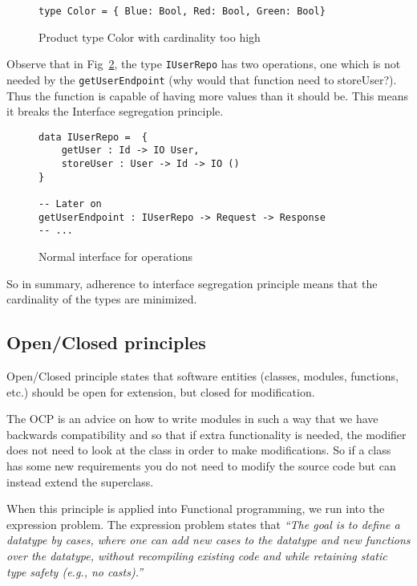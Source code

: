 \begin{figure}[H]
    \begin{lstlisting}
type Color = { Blue: Bool, Red: Bool, Green: Bool}
    \end{lstlisting}
    \caption{Product type Color with cardinality too high}
    \label{colorcardinality}
\end{figure}

Observe that in Fig~\ref{twomanyoperations}, the type \texttt{IUserRepo} has two
operations, one which is not needed by the \texttt{getUserEndpoint} (why would 
that function need to storeUser?). Thus the function is capable of having more 
values than it should be. This means it breaks the Interface segregation principle.

\begin{figure}[H]
    \begin{lstlisting}
data IUserRepo =  {
	getUser : Id -> IO User,
	storeUser : User -> Id -> IO ()
}

-- Later on
getUserEndpoint : IUserRepo -> Request -> Response
-- ...
    \end{lstlisting}
    \caption{Normal interface for operations}
    \label{twomanyoperations}
\end{figure}

So in summary, adherence to interface segregation principle means that the
cardinality of the types are minimized.

\subsection{Open/Closed principles}\label{openclosed}

Open/Closed principle states that software entities (classes, modules,
functions, etc.) should be open for extension, but closed for modification.

The OCP is an advice on how to write modules in such a way that we have
backwards compatibility and so that if extra functionality is needed, the
modifier does not need to look at the class in order to make modifications. So
if a class has some new requirements you do not need to modify the source code
but can instead extend the superclass.

When this principle is applied into Functional programming, we run into the
expression problem. The expression problem states that \textit{``The goal is to
define a datatype by cases, where one can add new cases to the datatype and new
functions over the datatype, without recompiling existing code and while
retaining static type safety (e.g., no casts).''}

